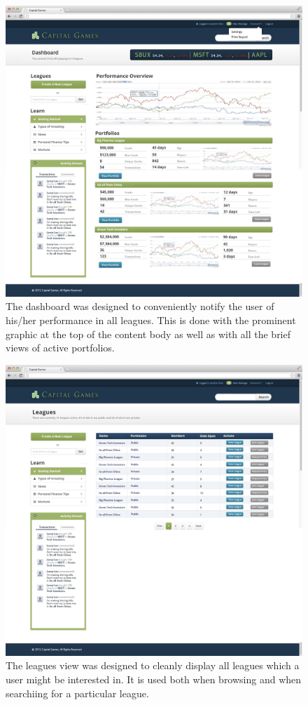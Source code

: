\begin{figure}
\includegraphics[width=5.5in]{./mockups/JPEG/dashboard.jpg}
\caption{The dashboard was designed to conveniently notify the user of his/her performance in all leagues. This is done with the prominent graphic at the top of the content body as well as with all the brief views of active portfolios.}
\end{figure}

\begin{figure}
\includegraphics[width=500px]{./mockups/JPEG/leagues.jpg}
\caption{The leagues view was designed to cleanly display all leagues which a user might be interested in. It is used both when browsing and when searchiing for a particular league.}
\end{figure}

